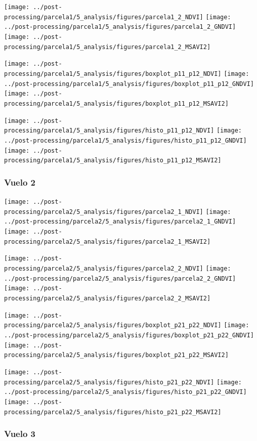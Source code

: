 \documentclass[spanish,openany]{article}
\begin{document}
\texttt{[image: ../post-processing/parcela1/5\_analysis/figures/parcela1\_2\_NDVI]}
\texttt{[image: ../post-processing/parcela1/5\_analysis/figures/parcela1\_2\_GNDVI]}
\texttt{[image: ../post-processing/parcela1/5\_analysis/figures/parcela1\_2\_MSAVI2]}

\texttt{[image: ../post-processing/parcela1/5\_analysis/figures/boxplot\_p11\_p12\_NDVI]}
\texttt{[image: ../post-processing/parcela1/5\_analysis/figures/boxplot\_p11\_p12\_GNDVI]}
\texttt{[image: ../post-processing/parcela1/5\_analysis/figures/boxplot\_p11\_p12\_MSAVI2]}

\texttt{[image: ../post-processing/parcela1/5\_analysis/figures/histo\_p11\_p12\_NDVI]}
\texttt{[image: ../post-processing/parcela1/5\_analysis/figures/histo\_p11\_p12\_GNDVI]}
\texttt{[image: ../post-processing/parcela1/5\_analysis/figures/histo\_p11\_p12\_MSAVI2]}

\subsubsection{Vuelo 2}\label{vuelo-2-1}

\texttt{[image: ../post-processing/parcela2/5\_analysis/figures/parcela2\_1\_NDVI]}
\texttt{[image: ../post-processing/parcela2/5\_analysis/figures/parcela2\_1\_GNDVI]}
\texttt{[image: ../post-processing/parcela2/5\_analysis/figures/parcela2\_1\_MSAVI2]}

\texttt{[image: ../post-processing/parcela2/5\_analysis/figures/parcela2\_2\_NDVI]}
\texttt{[image: ../post-processing/parcela2/5\_analysis/figures/parcela2\_2\_GNDVI]}
\texttt{[image: ../post-processing/parcela2/5\_analysis/figures/parcela2\_2\_MSAVI2]}

\texttt{[image: ../post-processing/parcela2/5\_analysis/figures/boxplot\_p21\_p22\_NDVI]}
\texttt{[image: ../post-processing/parcela2/5\_analysis/figures/boxplot\_p21\_p22\_GNDVI]}
\texttt{[image: ../post-processing/parcela2/5\_analysis/figures/boxplot\_p21\_p22\_MSAVI2]}

\texttt{[image: ../post-processing/parcela2/5\_analysis/figures/histo\_p21\_p22\_NDVI]}
\texttt{[image: ../post-processing/parcela2/5\_analysis/figures/histo\_p21\_p22\_GNDVI]}
\texttt{[image: ../post-processing/parcela2/5\_analysis/figures/histo\_p21\_p22\_MSAVI2]}

\subsubsection{Vuelo 3}\label{vuelo-3-1}
\end{document}

